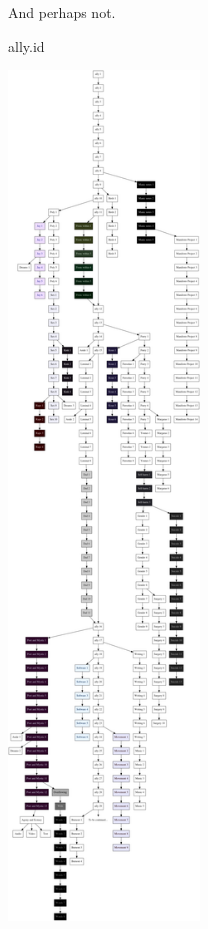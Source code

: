 \begin{paracol}{2}
\begin{leftcolumn}
  \begin{ally}
    And perhaps not.
  \end{ally}
  \vfill
  \begin{center}
    {\allyFont ally.id}
  \end{center}
  \vfill
\end{leftcolumn}
\begin{rightcolumn}
  \includegraphics[width=2in]{assets/map.png}
\end{rightcolumn}
\end{paracol}
\newpage

